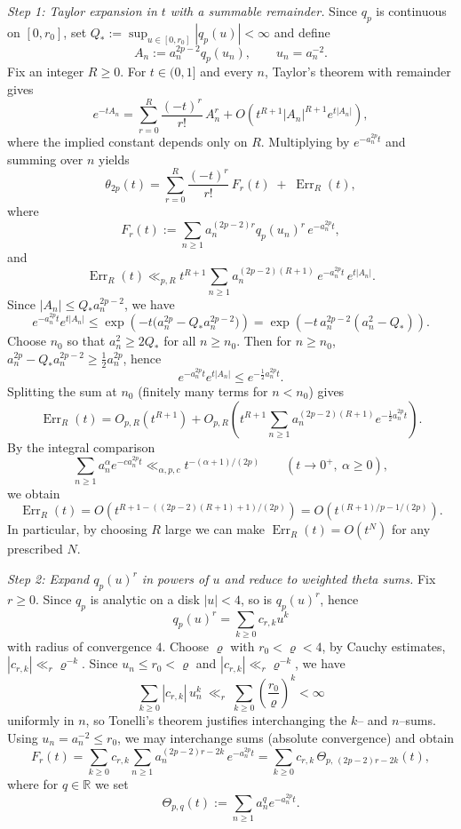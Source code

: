\documentclass[11pt,letterpaper]{amsart}
\numberwithin{equation}{section}
\theoremstyle{definition}
\newcommand{\Err}{\operatorname{Err}}
\begin{document}
\medskip
\noindent\emph{Step 1: Taylor expansion in $t$ with a summable remainder.}
Since $q_p$ is continuous on $[0,r_0]$, set $Q_*:=\sup_{u\in[0,r_0]}|q_p(u)|<\infty$ and define
\[
A_n:=a_n^{2p-2}q_p(u_n),\qquad u_n=a_n^{-2}.
\]
Fix an integer $R\ge0$. For $t\in(0,1]$ and every $n$, Taylor's theorem with remainder gives
\[
e^{-tA_n}
=\sum_{r=0}^{R}\frac{(-t)^r}{r!}\,A_n^{r}
+O\!\left(t^{R+1}|A_n|^{R+1}e^{t|A_n|}\right),
\]
where the implied constant depends only on $R$.
Multiplying by $e^{-a_n^{2p}t}$ and summing over $n$ yields
\begin{equation}\label{eq:theta2p-taylor}
\theta_{2p}(t)
=\sum_{r=0}^{R}\frac{(-t)^r}{r!}\,F_r(t) \;+\; \Err_R(t),
\end{equation}
where
\[
F_r(t):=\sum_{n\ge1}a_n^{(2p-2)r}q_p(u_n)^r\,e^{-a_n^{2p}t},
\]
and
\[
\Err_R(t)\ll_{p,R} t^{R+1}\sum_{n\ge1}a_n^{(2p-2)(R+1)}\,e^{-a_n^{2p}t}\,e^{t|A_n|}.
\]
Since $|A_n|\le Q_* a_n^{2p-2}$, we have
\[
e^{-a_n^{2p}t}e^{t|A_n|}
\le \exp\!\left(-t\bigl(a_n^{2p}-Q_*a_n^{2p-2}\bigr)\right)
=\exp\!\left(-t\,a_n^{2p-2}(a_n^2-Q_*)\right).
\]
Choose $n_0$ so that $a_n^2\ge 2Q_*$ for all $n\ge n_0$. Then for $n\ge n_0$,
$a_n^{2p}-Q_*a_n^{2p-2}\ge \tfrac12 a_n^{2p}$, hence
\[
e^{-a_n^{2p}t}e^{t|A_n|}\le e^{-\frac12 a_n^{2p}t}.
\]
Splitting the sum at $n_0$ (finitely many terms for $n<n_0$) gives
\[
\Err_R(t)
=O_{p,R}(t^{R+1})
+O_{p,R}\!\left(t^{R+1}\sum_{n\ge1}a_n^{(2p-2)(R+1)}e^{-\frac12 a_n^{2p}t}\right).
\]
By the integral comparison
\[
\sum_{n\ge1}a_n^{\alpha}e^{-c a_n^{2p}t}
\ll_{\alpha,p,c} t^{-(\alpha+1)/(2p)}\qquad(t\to0^+,\ \alpha\ge0),
\]
we obtain
\[
\Err_R(t)=O\!\left(t^{R+1-( (2p-2)(R+1)+1)/(2p)}\right)
=O\!\left(t^{(R+1)/p-1/(2p)}\right).
\]
In particular, by choosing $R$ large we can make $\Err_R(t)=O(t^{N})$ for any prescribed $N$.


\medskip
\noindent\emph{Step 2: Expand $q_p(u)^r$ in powers of $u$ and reduce to weighted theta sums.}
Fix $r\ge0$. Since $q_p$ is analytic on a disk $|u|<4$, so is $q_p(u)^r$, hence
\[
q_p(u)^r=\sum_{k\ge0} c_{r,k}u^k
\]
with radius of convergence $4$. Choose $\varrho$ with $r_0<\varrho<4$, by Cauchy estimates,
$|c_{r,k}|\ll_{r} \varrho^{-k}$. Since $u_n\le r_0<\varrho$ and $|c_{r,k}|\ll_r \varrho^{-k}$, we have
\[
\sum_{k\ge0}|c_{r,k}|\,u_n^k \ \ll_r\ \sum_{k\ge0}\left(\frac{r_0}{\varrho}\right)^k<\infty
\]
uniformly in $n$, so Tonelli's theorem justifies interchanging the $k$-- and $n$--sums.
Using $u_n=a_n^{-2}\le r_0$, we may interchange sums (absolute convergence) and obtain
\[
F_r(t)=\sum_{k\ge0}c_{r,k}\sum_{n\ge1}a_n^{(2p-2)r-2k}\,e^{-a_n^{2p}t}
=\sum_{k\ge0}c_{r,k}\,\Theta_{p,\, (2p-2)r-2k}(t),
\]
where for $q\in\mathbb{R}$ we set
\[
\Theta_{p,q}(t):=\sum_{n\ge1}a_n^{q}e^{-a_n^{2p}t}.
\]
\end{document}
